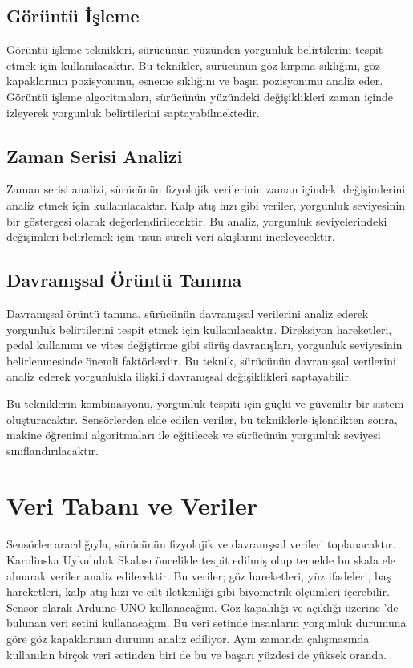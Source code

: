 \documentclass[12pt, a4paper]{report}
\begin{document}
\subsection{Görüntü İşleme}
Görüntü işleme teknikleri, sürücünün yüzünden yorgunluk belirtilerini tespit etmek için kullanılacaktır. Bu teknikler, sürücünün göz kırpma sıklığını, göz kapaklarının pozisyonunu, esneme sıklığını ve başın pozisyonunu analiz eder. Görüntü işleme algoritmaları, sürücünün yüzündeki değişiklikleri zaman içinde izleyerek yorgunluk belirtilerini saptayabilmektedir.

\subsection{Zaman Serisi Analizi}
Zaman serisi analizi, sürücünün fizyolojik verilerinin zaman içindeki değişimlerini analiz etmek için kullanılacaktır. Kalp atış hızı gibi veriler, yorgunluk seviyesinin bir göstergesi olarak değerlendirilecektir. Bu analiz, yorgunluk seviyelerindeki değişimleri belirlemek için uzun süreli veri akışlarını inceleyecektir.

\subsection{Davranışsal Örüntü Tanıma}
Davranışsal örüntü tanıma, sürücünün davranışsal verilerini analiz ederek yorgunluk belirtilerini tespit etmek için kullanılacaktır. Direksiyon hareketleri, pedal kullanımı ve vites değiştirme gibi sürüş davranışları, yorgunluk seviyesinin belirlenmesinde önemli faktörlerdir. Bu teknik, sürücünün davranışsal verilerini analiz ederek yorgunlukla ilişkili davranışsal değişiklikleri saptayabilir.

Bu tekniklerin kombinasyonu, yorgunluk tespiti için güçlü ve güvenilir bir sistem oluşturacaktır. Sensörlerden elde edilen veriler, bu tekniklerle işlendikten sonra, makine öğrenimi algoritmaları ile eğitilecek ve sürücünün yorgunluk seviyesi sınıflandırılacaktır.

\section{Veri Tabanı ve Veriler}
Sensörler aracılığıyla, sürücünün fizyolojik ve davranışsal verileri toplanacaktır. Karolinska Uykululuk Skalası öncelikle tespit edilmiş olup temelde bu skala ele alınarak veriler analiz edilecektir. Bu veriler; göz hareketleri, yüz ifadeleri, baş hareketleri, kalp atış hızı ve cilt iletkenliği gibi biyometrik ölçümleri içerebilir. Sensör olarak Arduino UNO kullanacağım.
Göz kapalılığı ve açıklığı üzerine \cite{aayushrai_driver_safety}'de bulunan veri setini kullanacağım. Bu veri setinde insanların yorgunluk durumuna göre göz kapaklarının durumu analiz ediliyor. Aynı zamanda \cite{csafak2022derin} çalışmasında kullanılan birçok veri setinden biri de bu ve başarı yüzdesi de yüksek oranda.
\end{document}
